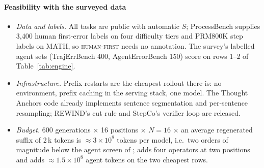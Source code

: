 \paragraph{Feasibility with the surveyed data}
\begin{itemize}[leftmargin=1.1em]
\item \emph{Data and labels.} All tasks are public with automatic $S$; ProcessBench supplies 3,400 human first-error labels on four difficulty tiers and PRM800K step labels on MATH, so \textsc{human-first} needs no annotation. The survey's labelled agent sets (TrajErrBench 400, AgentErrorBench 150) score  on rows 1--2 of Table~\ref{tab:engine}.
\item \emph{Infrastructure.} Prefix restarts are the cheapest rollout there is: no environment, prefix caching in the serving stack, one model. The Thought Anchors code \cite{bogdan2025thoughtanchors} already implements sentence segmentation and per-sentence resampling; REWIND's cut rule and StepCo's verifier loop are released.
\item \emph{Budget.} 600 generations $\times$ 16 positions $\times$ $N=16$ $\times$ an average regenerated suffix of 2\,k tokens is $\approx3\times10^8$ tokens per model, i.e.\ two orders of magnitude below the agent screen of ;  adds four operators at two positions and  adds $\approx1.5\times10^8$ agent tokens on the two cheapest rows.
\end{itemize}

